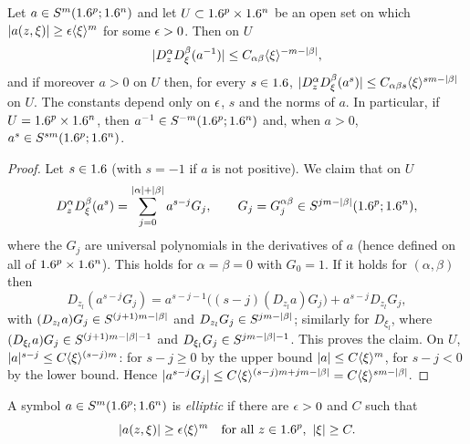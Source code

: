 \begin{lemma}\label{euclidean:lem:powers}
  Let $a\in S^m(1.6^p;1.6^n)$ and let $U\subset1.6^p\times1.6^n$ be an open set
  on which $\lvert a(z,\xi)\rvert\ge\epsilon\langle \xi\rangle^m$ for some $\epsilon>0$. Then on $U$
  \begin{equation*}
    \lvert D^\alpha_zD^\beta_\xi(a^{-1})\rvert\le C_{\alpha\beta}\langle \xi\rangle^{-m-\lvert \beta\rvert},
  \end{equation*}
  and if moreover $a>0$ on $U$ then, for every $s\in1.6$,
  $\lvert D^\alpha_zD^\beta_\xi(a^{s})\rvert\le C_{\alpha\beta s}\langle \xi\rangle^{sm-\lvert \beta\rvert}$
  on $U$. The constants depend only on $\epsilon$, $s$ and the norms of $a$. In
  particular, if $U=1.6^p\times1.6^n$, then $a^{-1}\in S^{-m}(1.6^p;1.6^n)$ and,
  when $a>0$, $a^s\in S^{sm}(1.6^p;1.6^n)$.
\end{lemma}
\begin{proof}
  Let $s\in1.6$ (with $s=-1$ if $a$ is not positive). We claim that on $U$
  \begin{equation*}
    D^\alpha_zD^\beta_\xi(a^s)=\sum_{j=0}^{\lvert \alpha\rvert+\lvert \beta\rvert}a^{s-j}G_{j},
    \qquad G_j=G_{j}^{\alpha\beta}\in S^{jm-\lvert \beta\rvert}(1.6^p;1.6^n),
  \end{equation*}
  where the $G_j$ are universal polynomials in the derivatives of $a$ (hence
  defined on all of $1.6^p\times1.6^n$). This holds for $\alpha=\beta=0$ with
  $G_0=1$. If it holds for $(\alpha,\beta)$ then
  \begin{equation*}
    D_{z_l}(a^{s-j}G_j)=a^{s-j-1}\bigl((s-j)(D_{z_l}a)G_j\bigr)+a^{s-j}D_{z_l}G_j,
  \end{equation*}
  with $(D_{z_l}a)G_j\in S^{(j+1)m-\lvert \beta\rvert}$ and
  $D_{z_l}G_j\in S^{jm-\lvert \beta\rvert}$; similarly for $D_{\xi_l}$, where
  $(D_{\xi_l}a)G_j\in S^{(j+1)m-\lvert \beta\rvert-1}$ and
  $D_{\xi_l}G_j\in S^{jm-\lvert \beta\rvert-1}$. This proves the claim. On $U$,
  $\lvert a\rvert^{s-j}\le C\langle \xi\rangle^{(s-j)m}$: for $s-j\ge0$ by the upper bound
  $\lvert a\rvert\le C\langle \xi\rangle^m$, for $s-j<0$ by the lower bound. Hence
  $\lvert a^{s-j}G_j\rvert\le C\langle \xi\rangle^{(s-j)m+jm-\lvert \beta\rvert}=C\langle \xi\rangle^{sm-\lvert \beta\rvert}$.
\end{proof}

\begin{definition}\label{euclidean:def:elliptic-symbol}
  A symbol $a\in S^m(1.6^p;1.6^n)$ is \emph{elliptic} if there are $\epsilon>0$ and
  $C$ such that
  \begin{equation}\label{euclidean:eq:elliptic-symbol}
    \abs{a(z,\xi)}\ge\eps\ang\xi^m\quad\text{for all }z\in\R^p,\ \abs\xi\ge C.
  \end{equation}
\end{definition}

